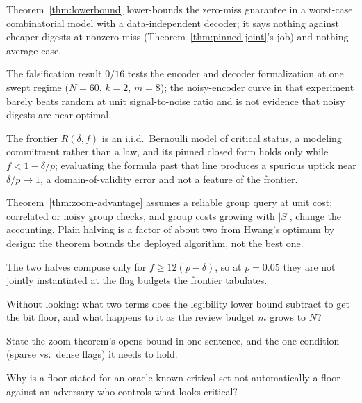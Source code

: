 \documentclass[11pt,a4paper]{article}
\theoremstyle{definition}
\theoremstyle{plain}
\begin{document}
\begin{pdboundary}
\setlength{\parskip}{4pt plus 1pt}
Theorem~\ref{thm:lowerbound} lower-bounds the zero-miss guarantee in a worst-case
combinatorial model with a data-independent decoder; it says nothing against
cheaper digests at nonzero miss (Theorem~\ref{thm:pinned-joint}'s job) and nothing
average-case.

The falsification result $0/16$ tests the encoder and decoder
formalization at one swept regime ($N{=}60$, $k{=}2$, $m{=}8$); the noisy-encoder
curve in that experiment barely beats random at unit signal-to-noise ratio and is
not evidence that noisy digests are near-optimal.

The frontier $R(\delta,f)$ is an
i.i.d.\ Bernoulli model of critical status, a modeling commitment rather than a
law, and its pinned closed form holds only while $f<1-\delta/p$; evaluating
the formula past that line produces a spurious uptick near
$\delta/p\to1$, a domain-of-validity error and not a feature of the frontier.

Theorem~\ref{thm:zoom-advantage} assumes a reliable group query at unit cost;
correlated or noisy group checks, and group costs growing with $|S|$, change the
accounting. Plain halving is a factor of about two from Hwang's optimum by design:
the theorem bounds the deployed algorithm, not the best one.

The two halves compose
only for $f\ge 12(p-\delta)$, so at $p{=}0.05$ they are not jointly instantiated at
the flag budgets the frontier tabulates.
\end{pdboundary}

\pdexercisepointer*{\ref{ex:ls-readpoverty-binding}}{\ref{ex:ls-b1-frontier-run}}{\pageref{ex:ls-readpoverty-binding}}

\begin{pdrecitation}
\item Without looking: what two terms does the legibility lower bound subtract to get the bit floor, and what happens to it as the review budget $m$ grows to $N$?
\item State the zoom theorem's opens bound in one sentence, and the one condition (sparse vs.\ dense flags) it needs to hold.
\item Why is a floor stated for an oracle-known critical set not automatically a floor against an adversary who controls what looks critical?
\end{pdrecitation}

\end{document}
